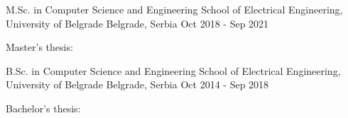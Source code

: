 


\begin{cventries}


\cventry
{M.Sc. in Computer Science and Engineering} %
{School of Electrical Engineering, University of Belgrade} %
{Belgrade, Serbia} %
{Oct 2018 - Sep 2021} %
{ %
\begin{cvitems}
\item {Master's thesis:}
\end{cvitems}
}

\cventry
{B.Sc. in Computer Science and Engineering} %
{School of Electrical Engineering, University of Belgrade} %
{Belgrade, Serbia} %
{Oct 2014 - Sep 2018} %
{ %
\begin{cvitems}
\item {Bachelor's thesis:}
\end{cvitems}
}


\end{cventries}